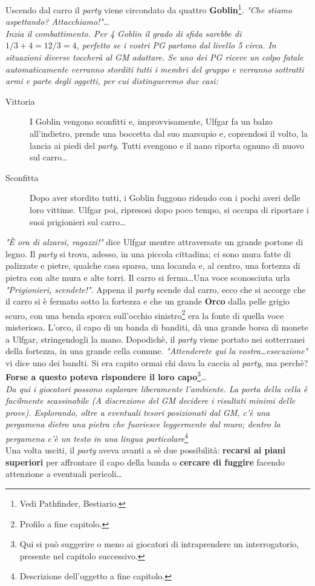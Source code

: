  		\HRule{0.5pt}
 		Uscendo dal carro il \textit{party} viene circondato da quattro \textbf{Goblin}\footnote{Vedi Pathfinder, Bestiario.}. \textit{"Che stiamo aspettando? Attacchiamo!"}\dots\\
 		\HRule{0.5pt}
 		\emph{Inzia il combattimento. Per 4 Goblin il grado di sfida sarebbe di $1/3 + 4 = 12/3 = 4$, perfetto se i vostri PG partono dal livello 5 circa. In situazioni diverse toccherà al GM adattare. Se uno dei PG riceve un colpo fatale automaticamente verranno storditi tutti i membri del gruppo e verranno sottratti armi e parte degli oggetti, per cui distingueremo due casi:}\par
 		\begin{description}
 			\item[Vittoria] I Goblin vengono sconfitti e, improvvisamente, Ulfgar fa un balzo all'indietro, prende una boccetta dal suo marsupio e, coprendosi il volto, la lancia ai piedi del \textit{party}. Tutti svengono e il nano riporta ognuno di nuovo sul carro\dots
 			\item[Sconfitta] Dopo aver stordito tutti, i Goblin fuggono ridendo con i pochi averi delle loro vittime. Ulfgar poi, ripresosi dopo poco tempo, si occupa di riportare i suoi prigionieri sul carro\dots
 		\end{description}
 		\textit{"È ora di alzarsi, ragazzi!"} dice Ulfgar mentre attraversate un grande portone di legno. Il \textit{party} si trova, adesso, in una piccola cittadina; ci sono mura fatte di palizzate e pietre, qualche casa sparsa, una locanda e, al centro, una fortezza di pietra con alte mura e alte torri. Il carro si ferma\dots Una voce sconosciuta urla \textit{"Prigionieri, scendete!"}. Appena il \textit{party} scende dal carro, ecco che si accorge che il carro si è fermato sotto la fortezza e che un grande \textbf{Orco} dalla pelle grigio scuro, con una benda sporca sull'occhio sinistro\footnote{Profilo a fine capitolo.} era la fonte di quella voce misteriosa. L'orco, il capo di un banda di banditi, dà una grande borsa di monete a Ulfgar, stringendogli la mano. Dopodichè, il \textit{party} viene portato nei sotterranei della fortezza, in una grande cella comune. \textit{"Attenderete qui la vostra\dots esecuzione"} vi dice uno dei bandti. Si era capito ormai chi dava la caccia al \textit{party}, ma perchè? \textbf{Forse a questo poteva rispondere il loro capo}\footnote{Qui si può suggerire o meno ai giocatori di intraprendere un interrogatorio, presente nel capitolo successivo.}\dots\\
 		\HRule{0.5pt}
 		\emph{Da qui i giocatori possono esplorare liberamente l'ambiente. La porta della cella è facilmente scassinabile (A discrezione del GM decidere i risultati minimi delle prove). Esplorando, oltre a eventuali tesori posizionati dal GM, c'è una pergamena dietro una pietra che fuoriesce leggermente dal muro; dentro la pergamena c'è un testo in una lingua particolare}\footnote{Descrizione dell'oggetto a fine capitolo.}\\
 		\HRule{0.5pt}
 		Una volta usciti, il \textit{party} aveva avanti a sè due possibilità: \textbf{recarsi ai piani superiori} per affrontare il capo della banda o \textbf{cercare di fuggire} facendo attenzione a eventuali pericoli\dots\newpage
